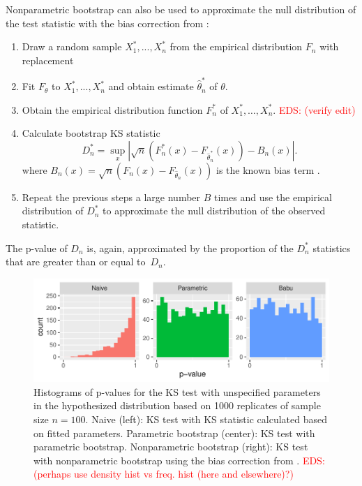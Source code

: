 \documentclass[12pt, letterpaper, titlepage]{article}
\newcommand{\eds}[1]{\textcolor{red}{EDS: (#1)}}
\begin{document}
Nonparametric bootstrap can also be used to approximate the null distribution
of the test statistic with the bias correction from \citet{babu2004goodness}:
\begin{enumerate}
\item
  Draw a random sample $X_1^*,...,X_n^*$ from the empirical distribution $F_n$
  with replacement
\item
  Fit $F_\theta$ to $X_1^*,...,X_n^*$ and obtain estimate 
	$\hat\theta_n^*$ of $\theta$.
\item
  Obtain the empirical distribution function $F_n^*$ of
  $X_1^*, \ldots,  X_n^*$. \eds{verify edit}
\item
  Calculate bootstrap KS statistic
  \[
    D_n^* = \sup_x | \sqrt{n}\left(F_n^* (x)- F_{\hat\theta_n^*}(x)\right) - B_n(x) |.
  \]
  where $B_{n}(x) = \sqrt{n}(F_{n}(x) - F_{\hat\theta_n}(x))$ is the known
  bias term \citep{babu2004goodness}.
\item
  Repeat the previous steps a large number $B$ times and use the empirical
  distribution of $D_n^*$ to approximate the null distribution of the observed
  statistic. 
\end{enumerate}
The p-value of $D_n$ is, again, approximated by the proportion of the $D_n^*$
statistics that are greater than or equal to~$D_n$. 


\begin{figure}[tbp]
  \centering
  \includegraphics[width=\textwidth]{hist_fitted}
  \caption{Histograms of p-values for the KS test with unspecified parameters in
    the hypothesized distribution based on 1000 replicates of sample size
    $n = 100$. Naive (left): KS test with KS statistic calculated based on fitted
    parameters. Parametric bootstrap (center): KS test with parametric
    bootstrap. Nonparametric bootstrap (right): KS test with nonparametric
    bootstrap using the bias correction from \citet{babu2004goodness}.
    \eds{perhaps use density hist vs
	freq. hist (here and elsewhere)?}}
  \label{fig:hist_fitted}
\end{figure}
\end{document}
